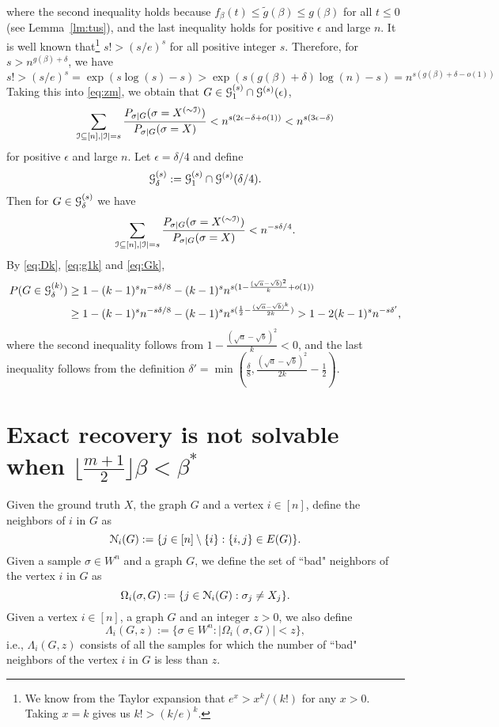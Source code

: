 \documentclass{article}
\begin{document}
where the second inequality holds because
$f_{\beta}(t)\le \tilde{g}(\beta) \le g(\beta)$ for all $t\le 0$
(see  Lemma~\ref{lm:tus}), and the last inequality holds for positive $\epsilon$ and large $n$.
It is well known that\footnote{We know from the Taylor expansion that $e^x>x^k/(k!)$ for any $x>0$. Taking $x=k$ gives us $k!>(k/e)^k$.}
$s!>(s/e)^s$
for all positive integer $s$.
Therefore, for $s>n^{g(\beta)+\delta}$, we have
$$
s!>(s/e)^s
=\exp(s\log(s)-s)
>\exp(s(g(\beta)+\delta)\log(n)-s)
=n^{s(g(\beta)+\delta-o(1))}
$$
Taking this into \eqref{eq:zm}, we obtain that $G\in\mathcal{G}_1^{(s)}\cap\mathcal{G}^{(s)}(\epsilon)$,
$$
\sum_{\mathcal{I}\subseteq[n],|\mathcal{I}|=s}
\frac{P_{\sigma|G}(\sigma=X^{(\sim \mathcal{I})} )}
{P_{\sigma|G}(\sigma=X)} 
< n^{s(2\epsilon-\delta+o(1))}
< n^{s(3\epsilon-\delta)}
$$
for positive $\epsilon$ and large $n$.
Let $\epsilon=\delta/4$ and define 
$$
\mathcal{G}_{\delta}^{(s)}
:=\mathcal{G}_1^{(s)}\cap\mathcal{G}^{(s)}(\delta/4) .
$$
Then for $G\in\mathcal{G}_{\delta}^{(s)}$ we have
$$
\sum_{\mathcal{I}\subseteq[n],|\mathcal{I}|=s}
\frac{P_{\sigma|G}(\sigma=X^{(\sim \mathcal{I})} )}
{P_{\sigma|G}(\sigma=X)} <
n^{-s \delta /4} .
$$
By \eqref{eq:Dk}, \eqref{eq:g1k} and \eqref{eq:Gk}, 
\begin{align*}
P(G\in\mathcal{G}_{\delta}^{(k)})
& \ge 1-(k-1)^s n^{-s\delta/8}- (k-1)^s n^{s (1-\frac{(\sqrt{a}-\sqrt{b})^2}{k} + o(1) )} \\
& \ge 1-(k-1)^s n^{-s\delta/8}- (k-1)^sn^{s(\frac{1}{2}-\frac{(\sqrt{a}-\sqrt{b})^k}{2k} )}
> 1- 2 (k-1)^s n^{-s\delta'},
\end{align*}
where the second inequality follows from  $1-\frac{(\sqrt{a}-\sqrt{b})^2}{k}< 0$, and the last inequality follows from the definition $\delta'=\min(\frac{\delta}{8},\frac{(\sqrt{a}-\sqrt{b})^2}{2k} - \frac{1}{2})$.


\section{Exact recovery is not solvable when $\lfloor \frac{m+1}{2} \rfloor \beta < \beta^\ast$}\label{sect:converse}

Given the ground truth $X$, the graph $G$ and a vertex $i\in[n]$, define the neighbors of $i$ in $G$ as 
\begin{equation} \label{eq:ngbi}
\mathcal{N}_i(G) := \{j\in[n]\setminus\{i\}:
\{i,j\}\in E(G) \} .
\end{equation}
Given a sample $\sigma\in W^n$ and a graph $G$,  we define the set of ``bad" neighbors of the vertex $i$ in $G$ as
$$
\Omega_i(\sigma,G):=\{j\in \mathcal{N}_i(G): 
\sigma_j \neq X_j \} .
$$
Given a vertex $i\in[n]$, a graph $G$ and an integer $z>0$, we also define
$$
\Lambda_i(G, z):=\{ \sigma\in W^n: |\Omega_i(\sigma,G)| < z \} ,
$$
i.e., $\Lambda_i(G, z)$ consists of all the samples for which the number of ``bad" neighbors of the vertex $i$ in $G$ is less than $z$.
\end{document}
